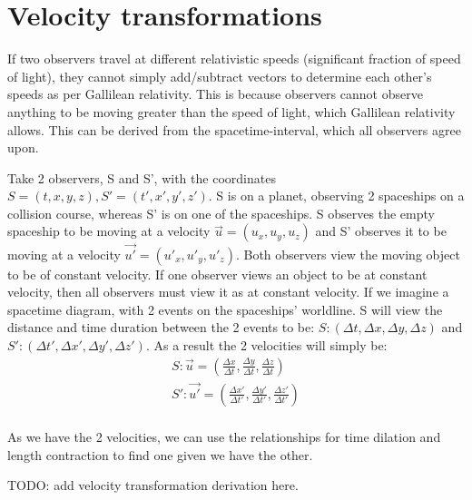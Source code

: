 \documentclass[10pt]{report}
\begin{document}
{\section{Velocity transformations}
\par{If two observers travel at different relativistic speeds (significant fraction of speed of light), they cannot simply add/subtract vectors to determine each other's speeds as per Gallilean relativity. This is because observers cannot observe anything to be moving greater than the speed of light, which Gallilean relativity allows. This can be derived from the spacetime-interval, which all observers agree upon.}
\par{Take 2 observers, S and S', with the coordinates $S=\left(t,x,y,z\right), S'=\left(t',x',y',z'\right)$. S is on a planet, observing 2 spaceships on a collision course, whereas S' is on one of the spaceships. S observes the empty spaceship to be moving at a velocity $\vec{u}=\left(u_{x},u_{y},u_{z}\right)$ and S' observes it to be moving at a velocity $\vec{u'}=\left(u'_{x},u'_{y},u'_{z}\right)$. Both observers view the moving object to be of constant velocity. If one observer views an object to be at constant velocity, then all observers must view it as at constant velocity. If we imagine a spacetime diagram, with 2 events on the spaceships' worldline. S will view the distance and time duration between the 2 events to be: $S:\left(\Delta t, \Delta x, \Delta y, \Delta z\right)$ and $S':\left(\Delta t', \Delta x', \Delta y', \Delta z'\right)$. As a result the 2 velocities will simply be: }
\begin{align*}
	S: \vec{u}=\left(\frac{\Delta x}{\Delta t},\frac{\Delta y}{\Delta t},\frac{\Delta z}{\Delta t}\right) \\
	S': \vec{u'}=\left(\frac{\Delta x'}{\Delta t'},\frac{\Delta y'}{\Delta t'},\frac{\Delta z'}{\Delta t'}\right) \\
\end{align*}
\par{As we have the 2 velocities, we can use the relationships for time dilation and length contraction to find one given we have the other.}

TODO: add velocity transformation derivation here.
}
\end{document}
